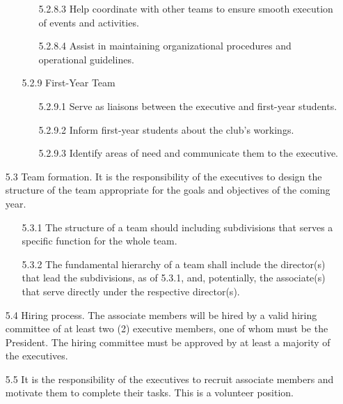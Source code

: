 \documentclass[12pt,a4paper]{article}
\begin{document}
\begin{enumerate}
\begin{enumerate}
\begin{enumerate}
\item[5.2.8.3] Help coordinate with other teams to ensure smooth execution of events and activities.

\item[5.2.8.4] Assist in maintaining organizational procedures and operational guidelines.
\end{enumerate}

\item[5.2.9] First-Year Team

\begin{enumerate}
\item[5.2.9.1] Serve as liaisons between the executive and first-year students.

\item[5.2.9.2] Inform first-year students about the club's workings.

\item[5.2.9.3] Identify areas of need and communicate them to the executive.
\end{enumerate}
\end{enumerate}

\item[5.3] Team formation. It is the responsibility of the executives to design the structure of the team appropriate for the goals and objectives of the coming year.

\begin{enumerate}
\item[5.3.1] The structure of a team should including subdivisions that serves a specific function for the whole team.

\item[5.3.2] The fundamental hierarchy of a team shall include the director(s) that lead the subdivisions, as of 5.3.1, and, potentially, the associate(s) that serve directly under the respective director(s).
\end{enumerate}

\item[5.4] Hiring process. The associate members will be hired by a valid hiring committee of at least two (2) executive members, one of whom must be the President. The hiring committee must be approved by at least a majority of the executives.

\item[5.5] It is the responsibility of the executives to recruit associate members and motivate them to complete their tasks. This is a volunteer position.
\end{enumerate}
\end{document}
